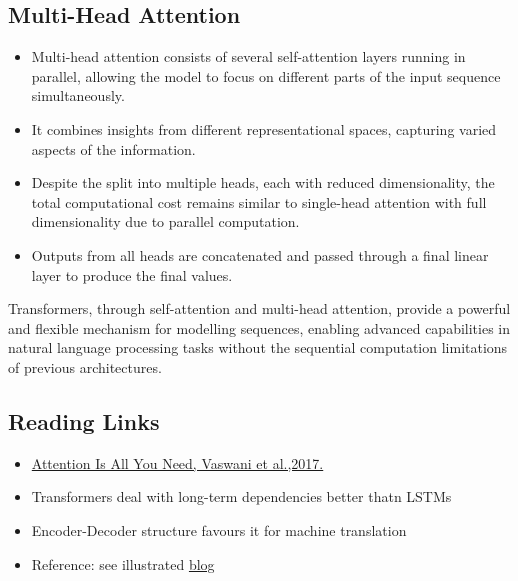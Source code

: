 \subsection{Multi-Head Attention}
\begin{itemize}
    \item Multi-head attention consists of several self-attention layers running in parallel, allowing the model to focus on different parts of the input sequence simultaneously.
    \item It combines insights from different representational spaces, capturing varied aspects of the information.
    \item Despite the split into multiple heads, each with reduced dimensionality, the total computational cost remains similar to single-head attention with full dimensionality due to parallel computation.
    \item Outputs from all heads are concatenated and passed through a final linear layer to produce the final values.
\end{itemize}

Transformers, through self-attention and multi-head attention, provide a powerful and flexible mechanism for modelling sequences, enabling advanced capabilities in natural language processing tasks without the sequential computation limitations of previous architectures.

\subsection{Reading Links}

\begin{itemize}
    \item \href{https://arxiv.org/abs/1706.03762}{Attention Is All You Need, Vaswani et al.,2017. }
    \item Transformers deal with long-term dependencies better thatn LSTMs
    \item Encoder-Decoder structure favours it for machine translation
    \item Reference: see illustrated \href{http://jalammar.github.io/ illustrated-transformer/}{blog}
\end{itemize}
